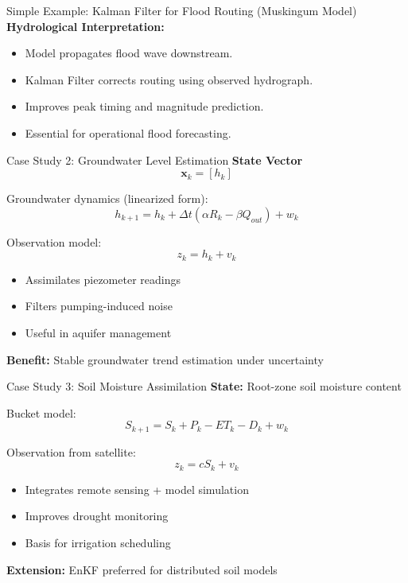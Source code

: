 \documentclass[8pt]{beamer}
\begin{document}
\begin{frame}{Simple Example: Kalman Filter for Flood Routing (Muskingum Model)}
\textbf{Hydrological Interpretation:}
\begin{itemize}
\item Model propagates flood wave downstream.
\item Kalman Filter corrects routing using observed hydrograph.
\item Improves peak timing and magnitude prediction.
\item Essential for operational flood forecasting.
\end{itemize}
\end{frame}

\begin{frame}{Case Study 2: Groundwater Level Estimation}
\textbf{State Vector}
\begin{equation}
\mathbf{x}_k = [h_k]
\end{equation}

Groundwater dynamics (linearized form):
\begin{equation}
h_{k+1} = h_k + \Delta t(\alpha R_k - \beta Q_{out}) + w_k
\end{equation}

Observation model:
\begin{equation}
z_k = h_k + v_k
\end{equation}

\begin{itemize}
\item Assimilates piezometer readings
\item Filters pumping-induced noise
\item Useful in aquifer management
\end{itemize}

\textbf{Benefit:} Stable groundwater trend estimation under uncertainty
\end{frame}

\begin{frame}{Case Study 3: Soil Moisture Assimilation}
\textbf{State:} Root-zone soil moisture content

Bucket model:
\begin{equation}
S_{k+1} = S_k + P_k - ET_k - D_k + w_k
\end{equation}

Observation from satellite:
\begin{equation}
z_k = c S_k + v_k
\end{equation}

\begin{itemize}
\item Integrates remote sensing + model simulation
\item Improves drought monitoring
\item Basis for irrigation scheduling
\end{itemize}

\textbf{Extension:} EnKF preferred for distributed soil models
\end{frame}
\end{document}
